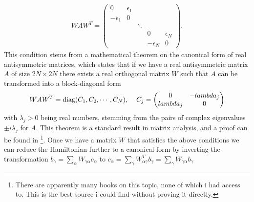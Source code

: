 \begin{align}
    W A W^T = \begin{pmatrix}
        0 & \epsilon_1 & & & \\
        -\epsilon_1 & 0 & & &\\
        & & \ddots & & \\
        & & & 0 & \epsilon_N \\
        & & & - \epsilon_N & 0
    \end{pmatrix}.
\end{align}
This condition stems from a mathematical theorem on the canonical form of real antisymmetric matrices, which states that if we have a real antisymmetric matrix $A$ of size $2N \times 2N$ there exists a real orthogonal matrix $W$ such that $A$ can be transformed into a block-diagonal form 
\begin{align}
    WAW^T = \text{diag}(C_1, C_2, \cdots, C_N), \hspace{4mm} C_j = \begin{pmatrix}
        0 & -\lambda_j \\
        \lambda_j & 0
    \end{pmatrix}
\end{align}
with $\lambda_j > 0$ being real numbers, stemming from the pairs of complex eigenvalues $\pm i \lambda_j$ for $A$. This theorem is a standard result in matrix analysis, and a proof can be found in \cite{zotero-item-34} \footnote{There are apparently many books on this topic, none of which i had access to. This is the best source i could find without proving it directly.}. Once we have a matrix $W$ that satisfies the above conditions we can reduce the Hamiltonian further to a canonical form by inverting the transformation $b_\gamma = \sum_\alpha W_{\gamma \alpha} c_\alpha$ to $c_\alpha = \sum_\gamma W_{\alpha \gamma}^T b_\gamma = \sum_\gamma W_{\gamma \alpha} b_\gamma$
